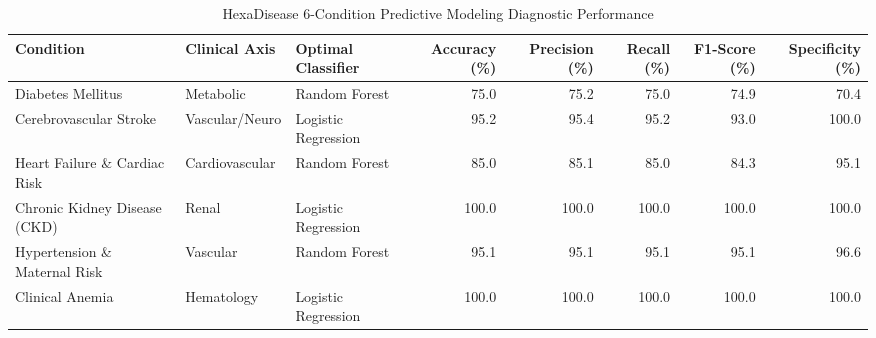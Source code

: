 \begin{table}[htbp]
\centering
\caption{HexaDisease 6-Condition Predictive Modeling Diagnostic Performance}
\label{tab:hexadisease_perf}
\begin{tabular}{lllrrrrr}
\toprule
Condition & Clinical Axis & Optimal Classifier & Accuracy (\%) & Precision (\%) & Recall (\%) & F1-Score (\%) & Specificity (\%) \\
\midrule
Diabetes Mellitus & Metabolic & Random Forest & 75.0 & 75.2 & 75.0 & 74.9 & 70.4 \\
Cerebrovascular Stroke & Vascular/Neuro & Logistic Regression & 95.2 & 95.4 & 95.2 & 93.0 & 100.0 \\
Heart Failure \& Cardiac Risk & Cardiovascular & Random Forest & 85.0 & 85.1 & 85.0 & 84.3 & 95.1 \\
Chronic Kidney Disease (CKD) & Renal & Logistic Regression & 100.0 & 100.0 & 100.0 & 100.0 & 100.0 \\
Hypertension \& Maternal Risk & Vascular & Random Forest & 95.1 & 95.1 & 95.1 & 95.1 & 96.6 \\
Clinical Anemia & Hematology & Logistic Regression & 100.0 & 100.0 & 100.0 & 100.0 & 100.0 \\
\bottomrule
\end{tabular}
\end{table}
